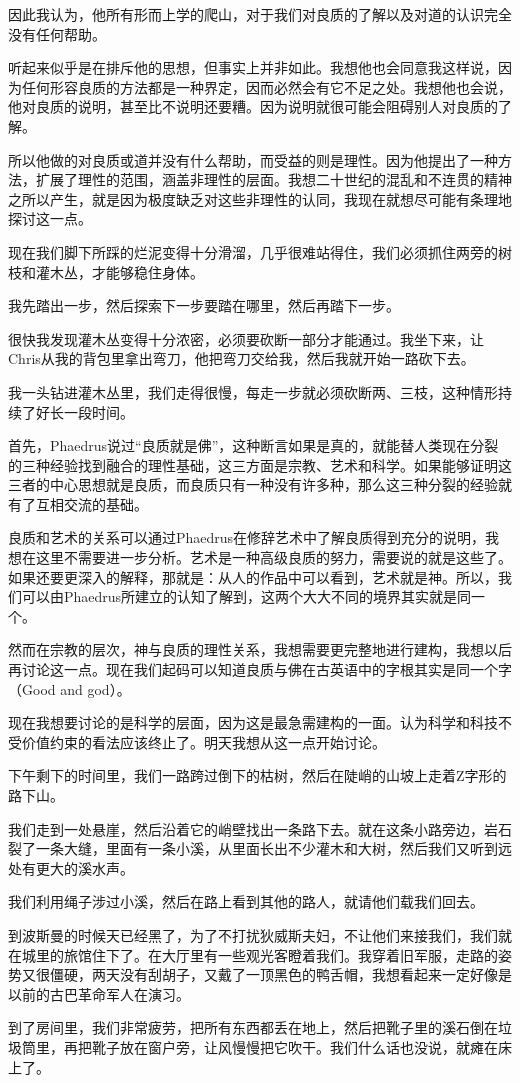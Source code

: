 \documentclass[UTF8]{article}
\begin{document}
\par 因此我认为，他所有形而上学的爬山，对于我们对良质的了解以及对道的认识完全没有任何帮助。
\par 听起来似乎是在排斥他的思想，但事实上并非如此。我想他也会同意我这样说，因为任何形容良质的方法都是一种界定，因而必然会有它不足之处。我想他也会说，他对良质的说明，甚至比不说明还要糟。因为说明就很可能会阻碍别人对良质的了解。
\par 所以他做的对良质或道并没有什么帮助，而受益的则是理性。因为他提出了一种方法，扩展了理性的范围，涵盖非理性的层面。我想二十世纪的混乱和不连贯的精神之所以产生，就是因为极度缺乏对这些非理性的认同，我现在就想尽可能有条理地探讨这一点。
\par 现在我们脚下所踩的烂泥变得十分滑溜，几乎很难站得住，我们必须抓住两旁的树枝和灌木丛，才能够稳住身体。
\par 我先踏出一步，然后探索下一步要踏在哪里，然后再踏下一步。
\par 很快我发现灌木丛变得十分浓密，必须要砍断一部分才能通过。我坐下来，让Chris从我的背包里拿出弯刀，他把弯刀交给我，然后我就开始一路砍下去。
\par 我一头钻进灌木丛里，我们走得很慢，每走一步就必须砍断两、三枝，这种情形持续了好长一段时间。
\par 首先，Phaedrus说过“良质就是佛”，这种断言如果是真的，就能替人类现在分裂的三种经验找到融合的理性基础，这三方面是宗教、艺术和科学。如果能够证明这三者的中心思想就是良质，而良质只有一种没有许多种，那么这三种分裂的经验就有了互相交流的基础。
\par 良质和艺术的关系可以通过Phaedrus在修辞艺术中了解良质得到充分的说明，我想在这里不需要进一步分析。艺术是一种高级良质的努力，需要说的就是这些了。如果还要更深入的解释，那就是：从人的作品中可以看到，艺术就是神。所以，我们可以由Phaedrus所建立的认知了解到，这两个大大不同的境界其实就是同一个。
\par 然而在宗教的层次，神与良质的理性关系，我想需要更完整地进行建构，我想以后再讨论这一点。现在我们起码可以知道良质与佛在古英语中的字根其实是同一个字（Good and god）。
\par 现在我想要讨论的是科学的层面，因为这是最急需建构的一面。认为科学和科技不受价值约束的看法应该终止了。明天我想从这一点开始讨论。
\par 下午剩下的时间里，我们一路跨过倒下的枯树，然后在陡峭的山坡上走着Z字形的路下山。
\par 我们走到一处悬崖，然后沿着它的峭壁找出一条路下去。就在这条小路旁边，岩石裂了一条大缝，里面有一条小溪，从里面长出不少灌木和大树，然后我们又听到远处有更大的溪水声。
\par 我们利用绳子涉过小溪，然后在路上看到其他的路人，就请他们载我们回去。
\par 到波斯曼的时候天已经黑了，为了不打扰狄威斯夫妇，不让他们来接我们，我们就在城里的旅馆住下了。在大厅里有一些观光客瞪着我们。我穿着旧军服，走路的姿势又很僵硬，两天没有刮胡子，又戴了一顶黑色的鸭舌帽，我想看起来一定好像是以前的古巴革命军人在演习。
\par 到了房间里，我们非常疲劳，把所有东西都丢在地上，然后把靴子里的溪石倒在垃圾筒里，再把靴子放在窗户旁，让风慢慢把它吹干。我们什么话也没说，就瘫在床上了。
\end{document}
